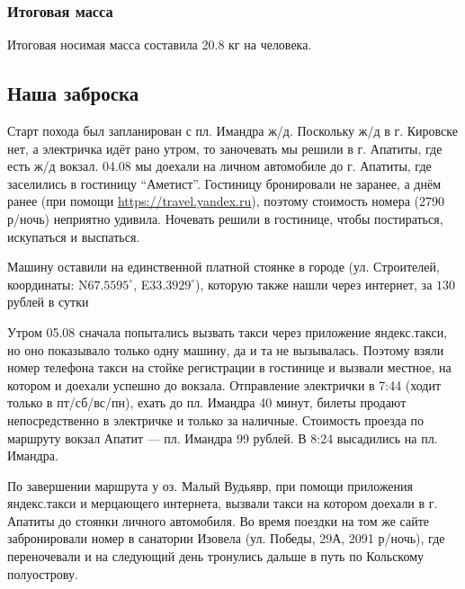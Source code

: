 \subsubsection{Итоговая масса}
Итоговая носимая масса составила 20.8 кг на человека.

\subsection{Наша заброска}
Старт похода был запланирован с пл. Имандра ж/д. Поскольку ж/д в г. Кировске нет, а электричка идёт рано утром,
то заночевать мы решили в г. Апатиты, где есть ж/д вокзал. 04.08 мы доехали на личном автомобиле до г. Апатиты,
где заселились в гостиницу ``Аметист''. Гостиницу бронировали не заранее, а днём ранее
(при помощи \url{https://travel.yandex.ru}), поэтому стоимость номера (2790 р/ночь) неприятно удивила.
Ночевать решили в гостинице, чтобы постираться, искупаться и выспаться.

Машину оставили на единственной платной стоянке в городе (ул. Строителей, координаты:
N$67.5595^{\circ}$, E$33.3929^{\circ}$),
которую также нашли через интернет, за $130$ рублей в сутки

Утром 05.08 сначала попытались вызвать такси через приложение яндекс.такси, но оно показывало только одну машину,
да и та не вызывалась. Поэтому взяли номер телефона такси на стойке регистрации в гостинице и вызвали местное,
на котором и доехали успешно до вокзала. Отправление электрички в 7:44 (ходит только в пт/сб/вс/пн),
ехать до пл. Имандра 40 минут, билеты продают непосредственно в электричке и только за наличные.
Стоимость проезда по маршруту вокзал Апатит --- пл. Имандра 99 рублей. В 8:24 высадились на пл. Имандра.

По завершении маршрута у оз. Малый Вудьявр, при помощи приложения яндекс.такси и мерцающего интернета,
вызвали такси на котором доехали в г. Апатиты до стоянки личного автомобиля.
Во время поездки на том же сайте забронировали номер в санатории Изовела (ул. Победы, 29А, 2091 р/ночь),
где переночевали и на следующий день тронулись дальше в путь по Кольскому полуострову.
